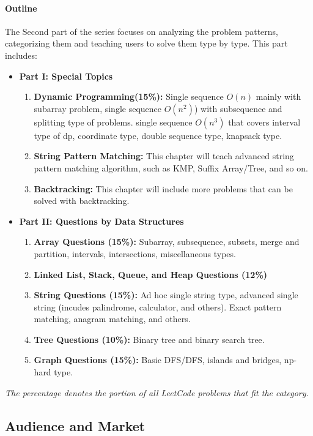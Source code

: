 \documentclass[12pt]{article}
\begin{document}
\paragraph{Outline} The Second part of the series focuses on analyzing the problem patterns, categorizing them and teaching users to solve them type by type. This part includes:
\begin{itemize}
\item \textbf{Part \RN{1}: Special Topics}
\begin{enumerate}
    \item \textbf{Dynamic Programming(15\%):} Single sequence $O(n)$ mainly with subarray problem, single sequence $O(n^2)$) with subsequence and splitting type of problems. single sequence $O(n^3)$ that covers interval type of dp, coordinate type, double sequence type, knapsack type.
    \item \textbf{String Pattern Matching:} This chapter will teach advanced string pattern matching algorithm, such as KMP, Suffix Array/Tree, and so on.
    \item \textbf{Backtracking:} This chapter will include more problems that can be solved with backtracking. 
\end{enumerate}


\item \textbf{Part \RN{2}: Questions by Data Structures }
\begin{enumerate}
    \item \textbf{Array Questions (15\%):} Subarray, subsequence, subsets, merge and partition, intervals, intersections, miscellaneous types.
\item \textbf{ Linked List, Stack, Queue, and Heap Questions (12\%)}
\item \textbf{String Questions (15\%):} Ad hoc single string type, advanced single string (incudes palindrome, calculator, and others). Exact pattern matching, anagram matching, and others.
\item \textbf{Tree Questions (10\%):} Binary tree and binary search tree.
\item \textbf{Graph Questions (15\%):} Basic DFS/DFS, islands and bridges, np-hard type.
\end{enumerate}


\end{itemize}
\textit{The percentage denotes the portion of all LeetCode problems that fit the category.}

\subsection{Audience and Market}
\end{document}
